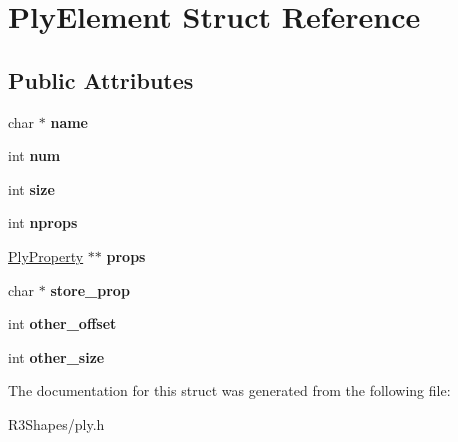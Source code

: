 \hypertarget{struct_ply_element}{}\section{Ply\+Element Struct Reference}
\label{struct_ply_element}
\subsection*{Public Attributes}
\begin{DoxyCompactItemize}
\item 
char $\ast$ {\bfseries name}\hypertarget{struct_ply_element_a851bfdee0489e67d5105d7f947dc7e35}{}\label{struct_ply_element_a851bfdee0489e67d5105d7f947dc7e35}

\item 
int {\bfseries num}\hypertarget{struct_ply_element_a3975c8d9bdd3b4435bca2cb6f7e99733}{}\label{struct_ply_element_a3975c8d9bdd3b4435bca2cb6f7e99733}

\item 
int {\bfseries size}\hypertarget{struct_ply_element_ab4a94646827e6b91a9778a4fea45a051}{}\label{struct_ply_element_ab4a94646827e6b91a9778a4fea45a051}

\item 
int {\bfseries nprops}\hypertarget{struct_ply_element_af8251c4b09b4292a0529a7c7acfe7771}{}\label{struct_ply_element_af8251c4b09b4292a0529a7c7acfe7771}

\item 
\hyperlink{struct_ply_property}{Ply\+Property} $\ast$$\ast$ {\bfseries props}\hypertarget{struct_ply_element_abd25d464578a898680daea44e24fbb21}{}\label{struct_ply_element_abd25d464578a898680daea44e24fbb21}

\item 
char $\ast$ {\bfseries store\+\_\+prop}\hypertarget{struct_ply_element_aa0e220908f47f0c2c3a5bcee0ee01d99}{}\label{struct_ply_element_aa0e220908f47f0c2c3a5bcee0ee01d99}

\item 
int {\bfseries other\+\_\+offset}\hypertarget{struct_ply_element_a3711e7f51c082da6639ac3239ee2444a}{}\label{struct_ply_element_a3711e7f51c082da6639ac3239ee2444a}

\item 
int {\bfseries other\+\_\+size}\hypertarget{struct_ply_element_a4ec699438f485c7ecca7cb7d623e4e74}{}\label{struct_ply_element_a4ec699438f485c7ecca7cb7d623e4e74}

\end{DoxyCompactItemize}


The documentation for this struct was generated from the following file\+:\begin{DoxyCompactItemize}
\item 
R3\+Shapes/ply.\+h\end{DoxyCompactItemize}
